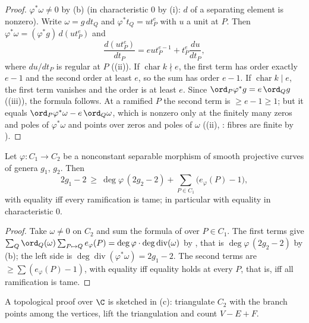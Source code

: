 \begin{proof}
$\varphi^*\omega\ne0$ by (b) (in characteristic $0$ by (i): $d$ of a separating element is
nonzero). Write $\omega=g\,dt_Q$ and $\varphi^*t_Q=ut_P^e$ with $u$ a unit at $P$. Then $\varphi^*\omega=(\varphi^*g)\,d(ut_P^e)$ and
\[
\frac{d(ut_P^e)}{dt_P}=eut_P^{e-1}+t_P^e\frac{du}{dt_P},
\]
where $du/dt_P$ is regular at $P$ ((ii)). If $\operatorname{char}k\nmid e$, the first term has order exactly $e-1$ and the second order at
least $e$, so the sum has order $e-1$. If $\operatorname{char}k\mid e$, the first term vanishes and the order is at least $e$. Since
$\ord_P\varphi^*g=e\,\ord_Qg$ ((iii)), the formula follows. At a ramified $P$ the second term is $\ge e-1\ge1$; but it equals
$\ord_P\varphi^*\omega-e\,\ord_Q\omega$, which is nonzero only at the finitely many zeros and poles of $\varphi^*\omega$ and points over zeros and poles of $\omega$
((ii), : fibres are finite by ).
\end{proof}

\begin{theorem}\label{thm:curves:riemann-hurwitz}
Let $\varphi\colon C_1\to C_2$ be a nonconstant separable morphism of smooth projective curves of genera $g_1$, $g_2$. Then
\[
2g_1-2\ \ge\ \deg\varphi\,(2g_2-2)+\sum_{P\in C_1}\bigl(e_\varphi(P)-1\bigr),
\]
with equality iff every ramification is tame; in particular with equality in characteristic $0$.
\end{theorem}

\begin{proof}
Take $\omega\ne0$ on $C_2$ and sum the formula of  over $P\in C_1$. The first terms give
$\sum_Q\ord_Q(\omega)\sum_{P\mapsto Q}e_\varphi(P)=\deg\varphi\cdot\deg\operatorname{div}(\omega)$ by , that is $\deg\varphi\,(2g_2-2)$ by
(b); the left side is $\deg\operatorname{div}(\varphi^*\omega)=2g_1-2$. The second terms are $\ge\sum(e_\varphi(P)-1)$, with equality iff equality
holds at every $P$, that is, iff all ramification is tame.
\end{proof}

A topological proof over $\C$ is sketched in (c): triangulate $C_2$ with the branch points among the vertices, lift the triangulation and
count $V-E+F$.

